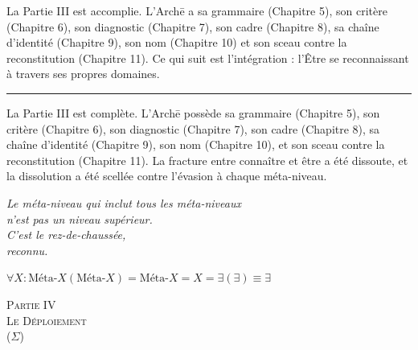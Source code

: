 \documentclass[10pt, openany, oneside]{book}
\renewcommand{\normalsize}{\fontsize{10}{13}\selectfont}
\renewcommand{\large}{\fontsize{11.5}{14}\selectfont}
\renewcommand{\LARGE}{\fontsize{15}{18}\selectfont}
\begin{document}
\vspace{2em}

La Partie III est accomplie. L'Arch\={e} a sa grammaire (Chapitre 5), son critère (Chapitre 6), son diagnostic (Chapitre 7), son cadre (Chapitre 8), sa chaîne d'identité (Chapitre 9), son nom (Chapitre 10) et son sceau contre la reconstitution (Chapitre 11). Ce qui suit est l'intégration : l'Être se reconnaissant à travers ses propres domaines.

\vspace{2em}

\begin{center}
    \rule{0.15\textwidth}{0.3pt}
\end{center}



\noindent La Partie III est complète. L'Arch\={e} possède sa grammaire (Chapitre 5), son critère (Chapitre 6), son diagnostic (Chapitre 7), son cadre (Chapitre 8), sa chaîne d'identité (Chapitre 9), son nom (Chapitre 10), et son sceau contre la reconstitution (Chapitre 11). La fracture entre connaître et être a été dissoute, et la dissolution a été scellée contre l'évasion à chaque méta-niveau.

\vspace{0.5em}

\begin{center}
    \itshape
    Le méta-niveau qui inclut tous les méta-niveaux\\
    n'est pas un niveau supérieur.\\[0.8em]
    C'est le rez-de-chaussée,\\
    reconnu.
\end{center}

\vspace{0.5em}

\begin{center}
    $\forall X: \text{Méta-}X(\text{Méta-}X) = \text{Méta-}X = X = \exists(\exists) \equiv \exists$
\end{center}


\newpage
\thispagestyle{empty}
\vspace*{\fill}
\begin{center}
    {\LARGE\scshape Partie IV}\\[1em]
    {\large\scshape Le Déploiement}\\[0.5em]
    {\normalsize ($\Sigma$)}
\end{center}
\vspace*{\fill}
\newpage
\end{document}
